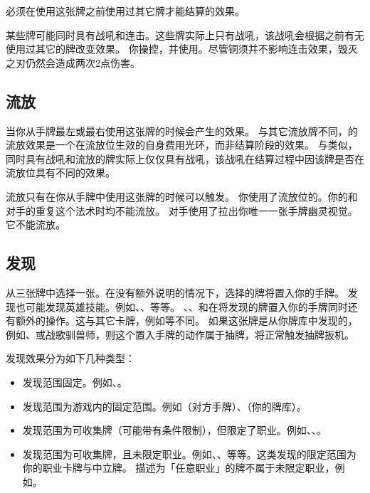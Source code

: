 必须在使用这张牌之前使用过其它牌才能结算的效果。

某些牌可能同时具有战吼和连击。这些牌实际上只有战吼，该战吼会根据之前有无使用过其它的牌改变效果。
\example 你操控，并使用。尽管铜须并不影响连击效果，毁灭之刃仍然会造成两次2点伤害。

\subsection{流放}
\label{outcast}

当你从手牌最左或最右使用这张牌的时候会产生的效果。
\notice 与其它流放牌不同，的流放效果是一个在流放位生效的自身费用光环，而非结算阶段的效果。
\notice 与类似，同时具有战吼和流放的牌实际上仅仅具有战吼，该战吼在结算过程中因该牌是否在流放位具有不同的效果。

流放只有在你从手牌中使用这张牌的时候可以触发。
\example 你使用了流放位的。你的和对手的重复这个法术时均不能流放。
\example 对手使用了拉出你唯一一张手牌幽灵视觉。它不能流放。

\subsection{发现}
\label{discover}

从三张牌中选择一张。在没有额外说明的情况下，选择的牌将置入你的手牌。
\notice 发现也可能发现英雄技能。例如、、等等。
\exception {}、、和在将发现的牌置入你的手牌同时还有额外的操作。这与其它卡牌，例如等不同。
\notice 如果这张牌是从你牌库中发现的，例如、或战歌驯兽师，则这个置入手牌的动作属于抽牌，将正常触发抽牌扳机。

发现效果分为如下几种类型：
\begin{itemize}
    \item 发现范围固定。例如、。
    \item 发现范围为游戏内的固定范围。例如（对方手牌）、（你的牌库）。
    \item 发现范围为可收集牌（可能带有条件限制），但限定了职业。例如、、。
    \item 发现范围为可收集牌，且未限定职业。例如、、等等。这类发现的限定范围为你的职业卡牌与中立牌。
        \notice 描述为「任意职业」的牌不属于未限定职业，例如。
\end{itemize}

